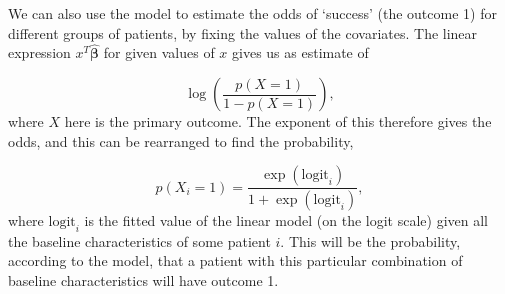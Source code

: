 \documentclass[
  openany]{book}
\theoremstyle{definition}
\theoremstyle{definition}
\theoremstyle{definition}
\theoremstyle{definition}
\theoremstyle{remark}
\begin{document}
We can also use the model to estimate the odds of `success' (the outcome 1) for different groups of patients, by fixing the values of the covariates. The linear expression \(x^T\hat{\boldsymbol\beta}\) for given values of \(x\) gives us as estimate of

\[\log\left(\frac{p(X=1)}{1-p(X=1)}\right),\]
where \(X\) here is the primary outcome. The exponent of this therefore gives the odds, and this can be rearranged to find the probability,

\[p\left(X_i=1\right) = \frac{\exp(\text{logit}_i)}{1+\exp(\text{logit}_i)}, \]
where \(\text{logit}_i\) is the fitted value of the linear model (on the logit scale) given all the baseline characteristics of some patient \(i\).
This will be the probability, according to the model, that a patient with this particular combination of baseline characteristics will have outcome 1.
\end{document}
